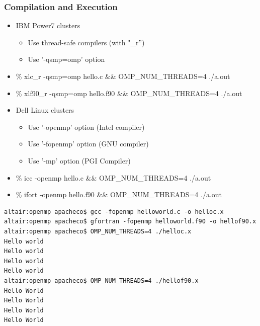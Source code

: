 \documentclass[c,mathserif,compress,xcolor=svgnames]{beamer}
\newenvironment{bblock}[0]
{
\begin{beamerboxesrounded}[upper=uppercol1,lower=lowercol1,shadow=true]}
{\end{beamerboxesrounded}}
\begin{document}
\begin{frame}[fragile]
  \frametitle{\small Compilation and Execution}
  \begin{itemize}
    \item IBM Power7 clusters
    \begin{itemize}
      \item Use thread-safe compilers (with "\_r'')
      \item Use '-qsmp=omp' option
    \end{itemize}
    \item[] \% xlc\_r -qsmp=omp hello.c \&\& OMP\_NUM\_THREADS=4 ./a.out
    \item[] \% xlf90\_r -qsmp=omp hello.f90 \&\& OMP\_NUM\_THREADS=4 ./a.out
    \item Dell Linux clusters
    \begin{itemize}
      \item Use '-openmp' option (Intel compiler)
      \item Use '-fopenmp' option (GNU compiler)
      \item Use '-mp' option (PGI Compiler)
    \end{itemize}
    \item[] \% icc -openmp hello.c \&\& OMP\_NUM\_THREADS=4 ./a.out
    \item[] \% ifort -openmp hello.f90 \&\& OMP\_NUM\_THREADS=4 ./a.out
  \end{itemize}
    \begin{bblock}{}
      {\tiny
        \begin{verbatim}
altair:openmp apacheco$ gcc -fopenmp helloworld.c -o helloc.x
altair:openmp apacheco$ gfortran -fopenmp helloworld.f90 -o hellof90.x
altair:openmp apacheco$ OMP_NUM_THREADS=4 ./helloc.x 
Hello world
Hello world
Hello world
Hello world
altair:openmp apacheco$ OMP_NUM_THREADS=4 ./hellof90.x
Hello World
Hello World
Hello World
Hello World
        \end{verbatim}
      }
    \end{bblock}
\end{frame}
\end{document}

